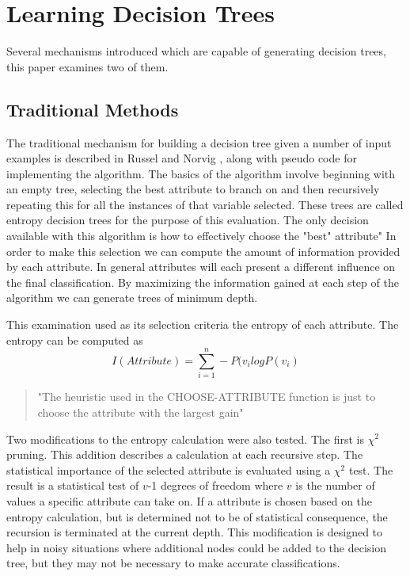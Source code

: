 \documentclass[12pt,letterpaper]{article}
\begin{document}
\section{Learning Decision Trees}
Several mechanisms introduced which are capable of generating decision trees, this paper examines two of them. 

\subsection{Traditional Methods}
The traditional mechanism for building a decision tree given a number of input examples is described in Russel and Norvig \cite{aima}, along with pseudo code for implementing the algorithm. The basics of the algorithm involve beginning with an empty tree, selecting the best attribute to branch on and then recursively repeating this for all the instances of that variable selected. These trees are called entropy decision trees for the purpose of this evaluation. The only decision available with this algorithm is how to effectively choose the "best" attribute" In order to make this selection we can compute the amount of information provided by each attribute. In general attributes will each present a different influence on the final classification. By maximizing the information gained at each step of the algorithm we can generate trees of minimum depth. 

This examination used as its selection criteria the entropy of each attribute. The entropy can be computed as 
\[
I(Attribute) = \sum_{i=1}^{n}-P(v_{i}log P(v_{i})
\]
\begin{quote}

"The heuristic used in the CHOOSE-ATTRIBUTE function is just to choose the attribute with the largest gain"
\end{quote}

Two modifications to the entropy calculation were also tested. The first is $\chi^{2}$ pruning. This addition describes a calculation at each recursive step. The statistical importance of the selected attribute is evaluated using a $\chi^{2}$ test. The result is a statistical test of $v$-1 degrees of freedom where $v$ is the number of values a specific attribute can take on. If a attribute is chosen based on the entropy calculation, but is determined not to be of statistical consequence, the recursion is terminated at the current depth. This modification is designed to help in noisy situations where additional nodes could be added to the decision tree, but they may not be necessary to make accurate classifications. 
\end{document}
